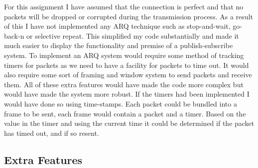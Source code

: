 \documentclass{article}
\begin{document}
For this assignment I have assumed that the connection is perfect and that no packets will be dropped or corrupted during the transmission process. As a result of this I have not implemented any ARQ technique such as stop-and-wait, go-back-n or selective repeat. This simplified my code substantially and made it much easier to display the functionality and premise of a publish-subscribe system. 
\newline 
\newline
To implement an ARQ system would require some method of tracking timers for packets as we need to have a facility for packets to time out. It would also require some sort of framing and window system to send packets and receive them. All of these extra features would have made the code more complex but would have made the system more robust.
\newline
\newline
If the timers had been implemented I would have done so using time-stamps. Each packet could be bundled into a frame to be sent, each frame would contain a packet and a timer. Based on the value in the timer and using the current time it could be determined if the packet has timed out, and if so resent.

\subsection{Extra Features}
\end{document}
